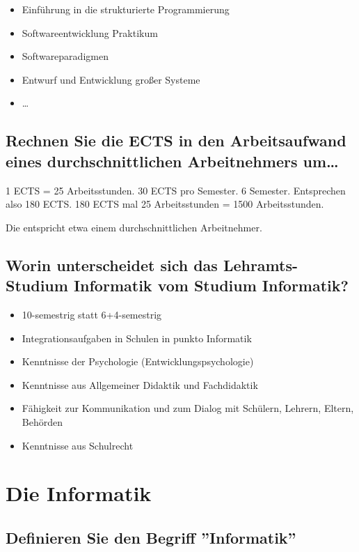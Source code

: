 \begin{itemize}
  \item Einführung in die strukturierte Programmierung
  \item Softwareentwicklung Praktikum
  \item Softwareparadigmen
  \item Entwurf und Entwicklung großer Systeme
  \item \dots
\end{itemize}

\subsection{Rechnen Sie die ECTS in den Arbeitsaufwand eines durchschnittlichen
    Arbeitnehmers um\dots}

1 ECTS = 25 Arbeitsstunden. 30 ECTS pro Semester. 6 Semester. Entsprechen
also 180 ECTS. 180 ECTS mal 25 Arbeitsstunden = 1500 Arbeitsstunden.

Die entspricht etwa einem durchschnittlichen Arbeitnehmer.

\subsection{Worin unterscheidet sich das Lehramts-Studium Informatik
    vom Studium Informatik?}

\begin{itemize}
  \item 10-semestrig statt 6+4-semestrig
  \item Integrationsaufgaben in Schulen in punkto Informatik
  \item Kenntnisse der Psychologie (Entwicklungspsychologie)
  \item Kenntnisse aus Allgemeiner Didaktik und Fachdidaktik
  \item Fähigkeit zur Kommunikation und zum Dialog mit Schülern,
        Lehrern, Eltern, Behörden
  \item Kenntnisse aus Schulrecht
\end{itemize}

\section{Die Informatik}

\subsection{Definieren Sie den Begriff ''Informatik''}

